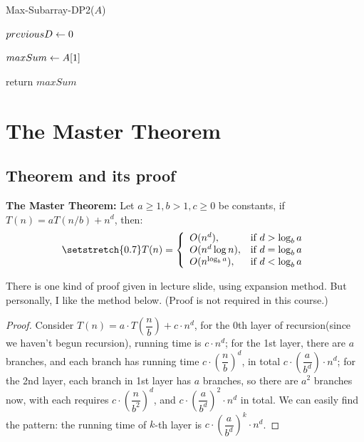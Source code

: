 \begin{spacing}{1.3}
    \begin{algorithm}[H]
        \caption{Max-Subarray-DP2($A$)}
        $previousD\leftarrow 0$ 

        $maxSum\leftarrow A[1]$

        return $maxSum$
    \end{algorithm}

    \newpage
    \section{The Master Theorem}

    \subsection{Theorem and its proof}

    \begin{theorem}
        {\bf The Master Theorem:} Let $a\ge 1, b>1, c\ge 0$
        be constants, if $T(n)=aT(n/b)+n^d$, then:
        \begin{align*}
            \setstretch{0.7}
            T(n)=\left\{ \begin{array}{ll}
                O(n^d), & \text{if } d>\log_b{a}\\
                O(n^d\log n), & \text{if } d = \log_b{a}\\
                O(n^{\log_b{a}}), & \text{if } d < \log_b{a}\\
            \end{array}\right.
        \end{align*}
    \end{theorem}
    

    There is one kind of proof given in lecture slide, 
    using expansion method. But personally, I like the method below.
    (Proof is not required in this course.)

    \begin{proof}
    Consider $T(n)=a\cdot T\left(\dfrac{n}{b}\right)+c\cdot n^{d}$,
    for the 0th layer of recursion(since we haven't begun recursion),
    running time is $c\cdot n^{d}$;
    for the 1st layer, there are $a$ branches, and each
    branch has running time $c\cdot \left(\dfrac{n}{b}\right)^d$, 
    in total $c\cdot \left(\dfrac{a}{b^d}\right)\cdot n^d$;
    for the 2nd layer, each branch in 1st layer has $a$ branches,
    so there are $a^2$ branches now, with each requires 
    $c\cdot \left(\dfrac{n}{b^2}\right)^d$, and 
    $c\cdot \left(\dfrac{a}{b^d}\right)^2\cdot n^d$ in total.
    We can easily find the pattern: 
    the running time of $k$-th layer is 
    $c\cdot \left(\dfrac{a}{b^d}\right)^k\cdot n^d$.


\end{proof}
\end{spacing}
